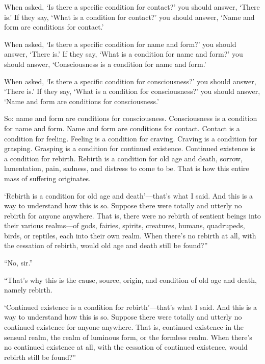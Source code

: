 \documentclass[12pt,openany]{book}%
\begin{document}
When asked, ‘Is there a specific condition for contact?’ you should answer, ‘There is.’ If they say, ‘What is a condition for contact?’ you should answer, ‘Name and form are conditions for contact.’ 

When asked, ‘Is there a specific condition for name and form?’ you should answer, ‘There is.’ If they say, ‘What is a condition for name and form?’ you should answer, ‘Consciousness is a condition for name and form.’ 

When asked, ‘Is there a specific condition for consciousness?’ you should answer, ‘There is.’ If they say, ‘What is a condition for consciousness?’ you should answer, ‘Name and form are conditions for consciousness.’ 

So: name and form are conditions for consciousness. Consciousness is a condition for name and form. Name and form are conditions for contact. Contact is a condition for feeling. Feeling is a condition for craving. Craving is a condition for grasping. Grasping is a condition for continued existence. Continued existence is a condition for rebirth. Rebirth is a condition for old age and death, sorrow, lamentation, pain, sadness, and distress to come to be. That is how this entire mass of suffering originates. 

‘Rebirth is a condition for old age and death’—that’s what I said. And this is a way to understand how this is so. Suppose there were totally and utterly no rebirth for anyone anywhere. That is, there were no rebirth of sentient beings into their various realms—of gods, fairies, spirits, creatures, humans, quadrupeds, birds, or reptiles, each into their own realm. When there’s no rebirth at all, with the cessation of rebirth, would old age and death still be found?” 

“No, sir.” 

“That’s why this is the cause, source, origin, and condition of old age and death, namely rebirth. 

‘Continued existence is a condition for rebirth’—that’s what I said. And this is a way to understand how this is so. Suppose there were totally and utterly no continued existence for anyone anywhere. That is, continued existence in the sensual realm, the realm of luminous form, or the formless realm. When there’s no continued existence at all, with the cessation of continued existence, would rebirth still be found?” 
\end{document}

